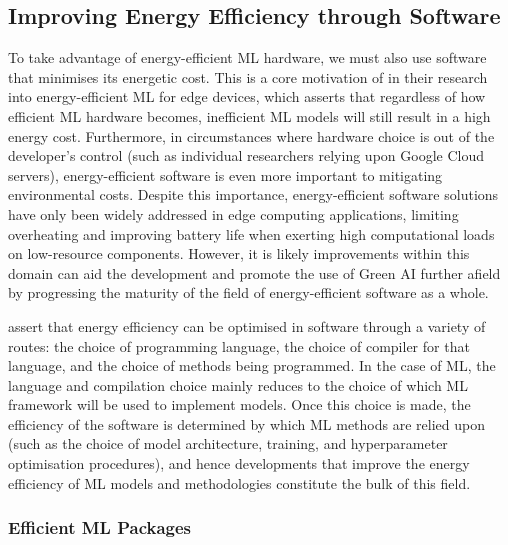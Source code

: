 \documentclass[a4paper, 12pt]{article}
\begin{document}
    \subsection{Improving Energy Efficiency through Software}

    To take advantage of energy-efficient ML hardware, we must also use software that minimises its energetic cost. This is a core motivation of \citet{kumar-2020} in their research into energy-efficient ML for edge devices, which asserts that regardless of how efficient ML hardware becomes, inefficient ML models will still result in a high energy cost. Furthermore, in circumstances where hardware choice is out of the developer's control (such as individual researchers relying upon Google Cloud servers), energy-efficient software is even more important to mitigating environmental costs. Despite this importance, energy-efficient software solutions have only been widely addressed in edge computing applications, limiting overheating and improving battery life when exerting high computational loads on low-resource components. However, it is likely improvements within this domain can aid the development and promote the use of Green AI further afield by progressing the maturity of the field of energy-efficient software as a whole.

    \citet{kumar-2020} assert that energy efficiency can be optimised in software through a variety of routes: the choice of programming language, the choice of compiler for that language, and the choice of methods being programmed. In the case of ML, the language and compilation choice mainly reduces to the choice of which ML framework will be used to implement models. Once this choice is made, the efficiency of the software is determined by which ML methods are relied upon (such as the choice of model architecture, training, and hyperparameter optimisation procedures), and hence developments that improve the energy efficiency of ML models and methodologies constitute the bulk of this field.

    \subsubsection{Efficient ML Packages}
\end{document}
